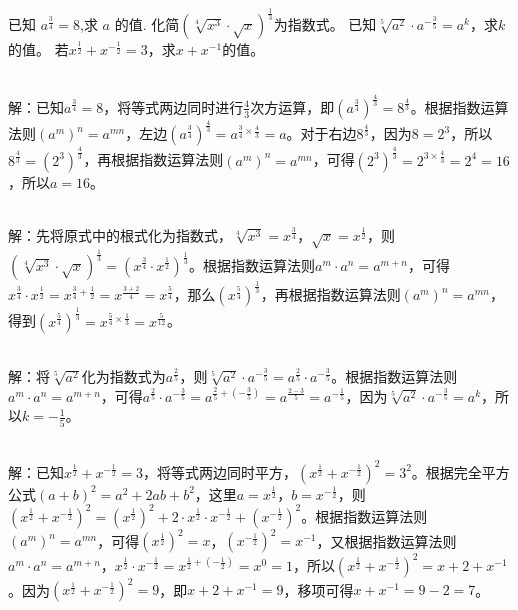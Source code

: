 \begin{Exercise}[title={根式与指数式互换进阶练习}, label={ex:radical - exponential - advanced},difficulty = 3]

    \Question 已知 $a^{\frac{3}{4}} = 8$,求 $a$ 的值.
    \Question 化简\((\sqrt[4]{x^3}\cdot\sqrt{x})^{\frac{1}{3}}\)为指数式。
    \Question 已知\(\sqrt[5]{a^2}\cdot a^{-\frac{3}{5}} = a^k\)，求\(k\)的值。
    \Question 若\(x^{\frac{1}{2}}+x^{-\frac{1}{2}} = 3\)，求\(x + x^{-1}\)的值。
\end{Exercise}
\begin{MyAnswer}[ref={ex:radical - exponential - advanced}]
        \Question  {}\\  解：已知\(a^{\frac{3}{4}} = 8\)，将等式两边同时进行\(\frac{4}{3}\)次方运算，即\((a^{\frac{3}{4}})^{\frac{4}{3}}=8^{\frac{4}{3}}\)。根据指数运算法则\((a^m)^n=a^{mn}\)，左边\((a^{\frac{3}{4}})^{\frac{4}{3}}=a^{\frac{3}{4}\times\frac{4}{3}} = a\)。对于右边\(8^{\frac{4}{3}}\)，因为\(8 = 2^3\)，所以\(8^{\frac{4}{3}}=(2^3)^{\frac{4}{3}}\)，再根据指数运算法则\((a^m)^n=a^{mn}\)，可得\((2^3)^{\frac{4}{3}}=2^{3\times\frac{4}{3}} = 2^4 = 16\)，所以\(a = 16\)。

        \Question {}\\ 解：先将原式中的根式化为指数式，\(\sqrt[4]{x^3}=x^{\frac{3}{4}}\)，\(\sqrt{x}=x^{\frac{1}{2}}\)，则\((\sqrt[4]{x^3}\cdot\sqrt{x})^{\frac{1}{3}}=(x^{\frac{3}{4}}\cdot x^{\frac{1}{2}})^{\frac{1}{3}}\)。根据指数运算法则\(a^m\cdot a^n=a^{m + n}\)，可得\(x^{\frac{3}{4}}\cdot x^{\frac{1}{2}}=x^{\frac{3}{4}+\frac{1}{2}}=x^{\frac{3 + 2}{4}}=x^{\frac{5}{4}}\)，那么\((x^{\frac{5}{4}})^{\frac{1}{3}}\)，再根据指数运算法则\((a^m)^n=a^{mn}\)，得到\((x^{\frac{5}{4}})^{\frac{1}{3}}=x^{\frac{5}{4}\times\frac{1}{3}}=x^{\frac{5}{12}}\)。

        \Question {}\\ 解：将\(\sqrt[5]{a^2}\)化为指数式为\(a^{\frac{2}{5}}\)，则\(\sqrt[5]{a^2}\cdot a^{-\frac{3}{5}}=a^{\frac{2}{5}}\cdot a^{-\frac{3}{5}}\)。根据指数运算法则\(a^m\cdot a^n=a^{m + n}\)，可得\(a^{\frac{2}{5}}\cdot a^{-\frac{3}{5}}=a^{\frac{2}{5}+(-\frac{3}{5})}=a^{\frac{2 - 3}{5}}=a^{-\frac{1}{5}}\)，因为\(\sqrt[5]{a^2}\cdot a^{-\frac{3}{5}} = a^k\)，所以\(k = -\frac{1}{5}\)。

        \Question  {}\\  解：已知\(x^{\frac{1}{2}}+x^{-\frac{1}{2}} = 3\)，将等式两边同时平方，\((x^{\frac{1}{2}}+x^{-\frac{1}{2}})^2 = 3^2\)。根据完全平方公式\((a + b)^2=a^2 + 2ab + b^2\)，这里\(a = x^{\frac{1}{2}}\)，\(b = x^{-\frac{1}{2}}\)，则\((x^{\frac{1}{2}}+x^{-\frac{1}{2}})^2=(x^{\frac{1}{2}})^2+2\cdot x^{\frac{1}{2}}\cdot x^{-\frac{1}{2}}+(x^{-\frac{1}{2}})^2\)。根据指数运算法则\((a^m)^n=a^{mn}\)，可得\((x^{\frac{1}{2}})^2=x\)，\((x^{-\frac{1}{2}})^2=x^{-1}\)，又根据指数运算法则\(a^m\cdot a^n=a^{m + n}\)，\(x^{\frac{1}{2}}\cdot x^{-\frac{1}{2}}=x^{\frac{1}{2}+(-\frac{1}{2})}=x^0 = 1\)，所以\((x^{\frac{1}{2}}+x^{-\frac{1}{2}})^2=x + 2 + x^{-1}\)。因为\((x^{\frac{1}{2}}+x^{-\frac{1}{2}})^2 = 9\)，即\(x + 2 + x^{-1}=9\)，移项可得\(x + x^{-1}=9 - 2 = 7\)。
\end{MyAnswer}
